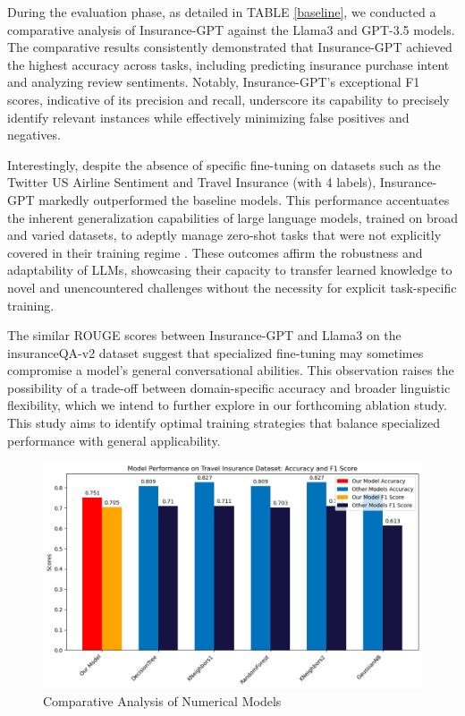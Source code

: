 \documentclass[conference]{IEEEtran}
\begin{document}
During the evaluation phase, as detailed in TABLE \ref{baseline}, we conducted a comparative analysis of Insurance-GPT against the Llama3 and GPT-3.5 models. The comparative results consistently demonstrated that Insurance-GPT achieved the highest accuracy across tasks, including predicting insurance purchase intent and analyzing review sentiments. Notably, Insurance-GPT's exceptional F1 scores, indicative of its precision and recall, underscore its capability to precisely identify relevant instances while effectively minimizing false positives and negatives.

Interestingly, despite the absence of specific fine-tuning on datasets such as the Twitter US Airline Sentiment and Travel Insurance (with 4 labels), Insurance-GPT markedly outperformed the baseline models. This performance accentuates the inherent generalization capabilities of large language models, trained on broad and varied datasets, to adeptly manage zero-shot tasks that were not explicitly covered in their training regime \cite{wei2022finetuned}. These outcomes affirm the robustness and adaptability of LLMs, showcasing their capacity to transfer learned knowledge to novel and unencountered challenges without the necessity for explicit task-specific training.

The similar ROUGE scores between Insurance-GPT and Llama3 on the insuranceQA-v2 dataset suggest that specialized fine-tuning may sometimes compromise a model's general conversational abilities. This observation raises the possibility of a trade-off between domain-specific accuracy and broader linguistic flexibility, which we intend to further explore in our forthcoming ablation study. This study aims to identify optimal training strategies that balance specialized performance with general applicability.

\begin{figure}[h]
    \centering
    \includegraphics[width=1\linewidth]{baseline model.png}
    \caption{Comparative Analysis of Numerical Models}
    \label{fig:baseline}
\end{figure}
\end{document}
